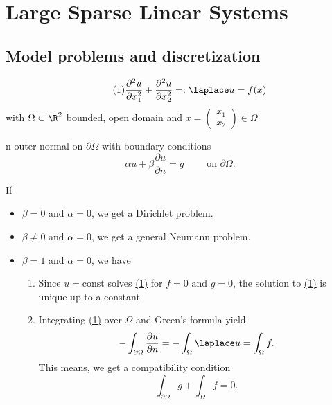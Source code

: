 
\chapter{Large Sparse Linear Systems}
\section{Model problems and discretization}%
\label{sec:Modelproblems and discretization}


\begin{equation}\label{eq:eq_1}\tag{1}
	\frac{\partial^2 u}{\partial x_1^2} + \frac{\partial^2 u}{\partial x_2^2} =: \laplace u = f(x) 
\end{equation}
with $\Omega \subset \R^2$ bounded, open domain and 
$ x =
\begin{pmatrix}
x_1 \\
x_2
\end{pmatrix}
\in \Omega$

n outer normal on $\partial \Omega$
with boundary conditions
\[
\alpha u + \beta \frac{\partial u}{\partial n} = g \qquad \text{ on } \partial \Omega
.\] 

If \begin{itemize}
	\item $ \beta = 0$ and $\alpha=0$, we get a Dirichlet problem.
	\item  $\beta \neq 0$ and $ \alpha = 0$, we get a general Neumann problem.
	\item $\beta = 1$ and $\alpha = 0$, we have
		\begin{enumerate}
			\item Since $u = \text{const}$ solves \href{eq:eq_1}{(1)} 
				for $f=0 \text{ and } g = 0$, the solution to \href{eq:eq_1}{(1)} is unique up to a constant
			\item Integrating \href{eq:eq_1}{(1)} over $\Omega$ and Green's formula yield
				\[
				- \int_{\partial\Omega} \frac{\partial u}{\partial n} = - \int_{\Omega} \laplace u = \int_{\Omega} f
				.\] 
				This means, we get a compatibility condition
				\[
				\int_{\partial \Omega} g + \int_{\Omega}f = 0
				.\] 
		\end{enumerate}
\end{itemize} 

